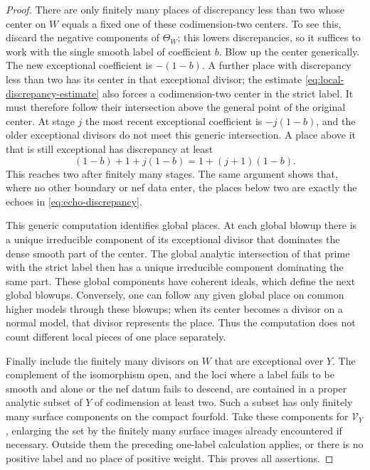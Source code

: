 \documentclass[11pt]{amsart}
\theoremstyle{definition}
\theoremstyle{remark}
\numberwithin{equation}{section}
\begin{document}
\begin{proof}
There are only finitely many places of discrepancy less than two whose
center on \(W\) equals a fixed one of these codimension-two centers.  To see this, discard the negative
components of \(\Theta_W\); this lowers discrepancies, so it suffices to
work with the single smooth label of coefficient \(b\).  Blow up the center
generically.  The new exceptional coefficient is \(-(1-b)\).  A further
place with discrepancy less than two has its center in that exceptional
divisor; the estimate \eqref{eq:local-discrepancy-estimate} also forces a
codimension-two center in the strict label.  It must therefore follow their
intersection above the general point of the original center.  At stage
\(j\) the most recent exceptional coefficient is \(-j(1-b)\), and the
older exceptional divisors do not meet this generic intersection.  A place
above it that is still exceptional has discrepancy at least
\[
 (1-b)+1+j(1-b)=1+(j+1)(1-b).
\]
This reaches two after finitely many stages.  The same argument shows that,
where no other boundary or nef data enter, the places below two are exactly
the echoes in \eqref{eq:echo-discrepancy}.

This generic computation identifies global places.  At each global blowup
there is a unique irreducible component of its exceptional divisor that
dominates the dense smooth part of the center.  The global analytic
intersection of that prime with the strict label then has a unique
irreducible component dominating the same part.  These global components
have coherent ideals, which define the next global blowups.  Conversely,
one can follow any given global place on common higher models through these
blowups; when its center becomes a divisor on a normal model, that divisor
represents the place.  Thus the computation does not count different local
pieces of one place separately.

Finally include the finitely many divisors on \(W\) that are exceptional
over \(Y\).  The complement of the isomorphism open, and the loci where a
label fails to be smooth and alone or the nef datum fails to descend, are
contained in a proper analytic subset of \(Y\) of codimension at least
two.  Such a subset has only finitely many surface components on the compact
fourfold.  Take these components for \(\mathcal V_Y\), enlarging the set
by the finitely many surface images already encountered if necessary.
Outside them the preceding one-label calculation applies, or there is no
positive label and no place of positive weight.  This proves all assertions.
\end{proof}
\end{document}
